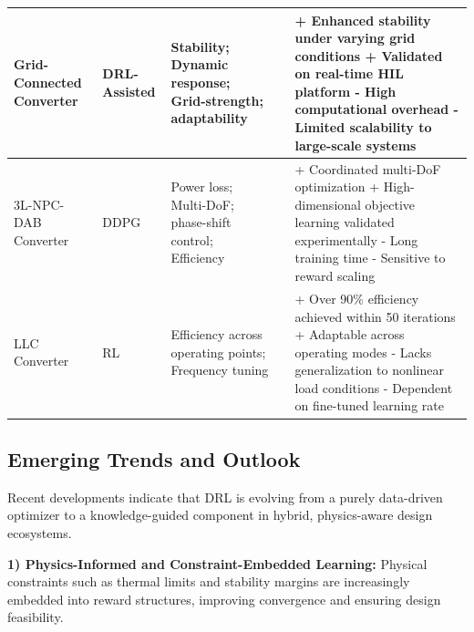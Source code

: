 \begin{table}[t]
{\begin{tabular}{@{}p{1.5cm} l p{2.8cm} l p{7.2cm}@{}}
Grid-Connected Converter & DRL-Assisted &
Stability; \newline
Dynamic response; \newline
Grid-strength; \newline adaptability &
\cite{jiang2023stability} &
+ Enhanced stability under varying grid conditions \newline
+ Validated on real-time HIL platform \newline
- High computational overhead \newline
- Limited scalability to large-scale systems \\ 
\midrule

3L-NPC-DAB Converter & DDPG &
Power loss; \newline
Multi-DoF; \newline phase-shift control; \newline
Efficiency &
\cite{feng2025deep} &
+ Coordinated multi-DoF optimization \newline
+ High-dimensional objective learning validated experimentally \newline
- Long training time \newline
- Sensitive to reward scaling \\ 
\midrule

LLC Converter & RL &
Efficiency across \newline operating points; \newline
Frequency tuning &
\cite{kruse2022parameter} &
+ Over 90\% efficiency achieved within 50 iterations \newline
+ Adaptable across operating modes \newline
- Lacks generalization to nonlinear load conditions \newline
- Dependent on fine-tuned learning rate \\ 
\bottomrule
\end{tabular}}
\end{table}

\subsection{Emerging Trends and Outlook}
\label{sec:drl_design_trends}

Recent developments indicate that DRL is evolving from a purely data-driven optimizer to a knowledge-guided component in hybrid, physics-aware design ecosystems.  

\textbf{1) Physics-Informed and Constraint-Embedded Learning:}  
Physical constraints such as thermal limits and stability margins are increasingly embedded into reward structures, improving convergence and ensuring design feasibility.  

